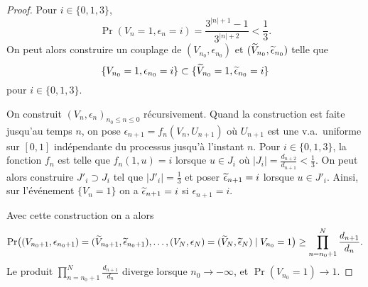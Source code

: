 \documentclass[12pt,a4paper]{article}
\begin{document}
\begin{proof}
Pour $i \in \{0,1,3\}$, 
$$
\Pr(V_n=1, \epsilon_n=i) = \frac{3^{|n|+1}-1}{3^{|n|+2}} < \frac{1}{3}.
$$
On peut alors construire un couplage de 
$(V_{n_0}, \epsilon_{n_0})$ et $(\widetilde{V}_{n_0},\widetilde{\epsilon}_{n_0})$ telle que 
$$
\{V_{n_0}=1, \epsilon_{n_0}=i\} \subset \{\widetilde{V}_{n_0}=1,\widetilde{\epsilon}_{n_0} = i\} 
$$
pour $i \in \{0,1,3\}$. 

On construit ${(V_n, \epsilon_n)}_{n_0 \leq n \leq 0}$ récursivement. 
Quand la construction est faite jusqu'au temps $n$, 
on pose $\epsilon_{n+1} = f_n(V_n, U_{n+1})$ où 
$U_{n+1}$ est une v.a.\ uniforme sur $[0,1]$ indépendante du processus jusqu'à 
l'instant $n$. Pour $i \in \{0,1,3\}$, la fonction $f_n$ est telle que 
$f_n(1, u) = i$ lorsque $u \in J_i$ où  $|J_i| = \frac{d_{n+2}}{d_{n+1}} < \frac{1}{3}$. 
On peut alors construire $J'_i \supset J_i$ tel que $|J'_i|=\frac{1}{3}$ et 
poser $\widetilde{\epsilon}_{n+1}=i$ lorsque $u \in J'_i$. 
Ainsi, sur l'événement $\{V_n=1\}$ on a $\widetilde{\epsilon}_{n+1}=i$ si $\epsilon_{n+1}=i$. 

Avec cette construction on a alors 
$$
\Pr\bigl((V_{n_0+1}, \epsilon_{n_0+1})=(\widetilde{V}_{n_0+1}, \widetilde{\epsilon}_{n_0+1}), 
\ldots, (V_N, \epsilon_{N})=(\widetilde{V}_{N},\widetilde{\epsilon}_{N}) 
\mid V_{n_0}=1 \bigr) \geq \prod_{n=n_0+1}^N \frac{d_{n+1}}{d_{n}}.  
$$
Le produit $\prod_{n=n_0+1}^N \frac{d_{n+1}}{d_{n}}$ diverge lorsque $n_0 \to -\infty$, 
et $\Pr(V_{n_0}=1) \to 1$. 
\end{proof}



%
%
%
\end{document}

